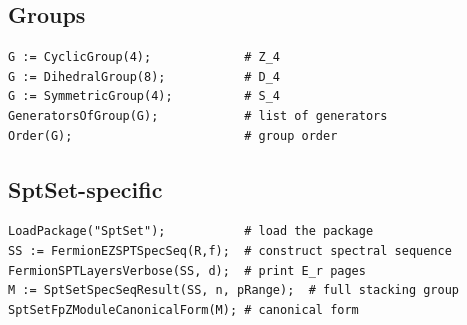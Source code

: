 \documentclass{SciPost}
\theoremstyle{definition}
\begin{document}
\subsection{Groups}
\begin{verbatim}
G := CyclicGroup(4);             # Z_4
G := DihedralGroup(8);           # D_4
G := SymmetricGroup(4);          # S_4
GeneratorsOfGroup(G);            # list of generators
Order(G);                        # group order
\end{verbatim}

\subsection{SptSet-specific}
\begin{verbatim}
LoadPackage("SptSet");           # load the package
SS := FermionEZSPTSpecSeq(R,f);  # construct spectral sequence
FermionSPTLayersVerbose(SS, d);  # print E_r pages
M := SptSetSpecSeqResult(SS, n, pRange);  # full stacking group
SptSetFpZModuleCanonicalForm(M); # canonical form
\end{verbatim}



\end{document}
